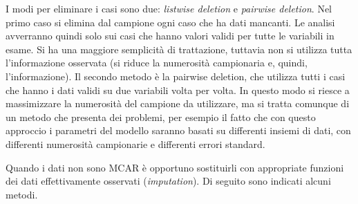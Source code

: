 \documentclass[
  11pt,
]{krantz}
\theoremstyle{definition}
\theoremstyle{definition}
\theoremstyle{definition}
\theoremstyle{definition}
\theoremstyle{remark}
\begin{document}
I modi per eliminare i casi sono due: \emph{listwise deletion} e \emph{pairwise deletion}. Nel primo caso si elimina dal campione ogni caso che ha dati mancanti. Le analisi avverranno quindi solo sui casi che hanno valori validi per tutte le variabili in esame. Si ha una maggiore semplicità di trattazione, tuttavia non si utilizza tutta l'informazione osservata (si riduce la numerosità campionaria e, quindi, l'informazione). Il secondo metodo è la pairwise deletion, che utilizza tutti i casi che hanno i dati validi su due variabili volta per volta. In questo modo si riesce a massimizzare la numerosità del campione da utilizzare, ma si tratta comunque di un metodo che presenta dei problemi, per esempio il fatto che con questo approccio i parametri del modello saranno basati su differenti insiemi di dati, con differenti numerosità campionarie e differenti errori standard.

Quando i dati non sono MCAR è opportuno sostituirli con appropriate funzioni dei dati effettivamente osservati (\emph{imputation}). Di seguito sono indicati alcuni metodi.
\end{document}
